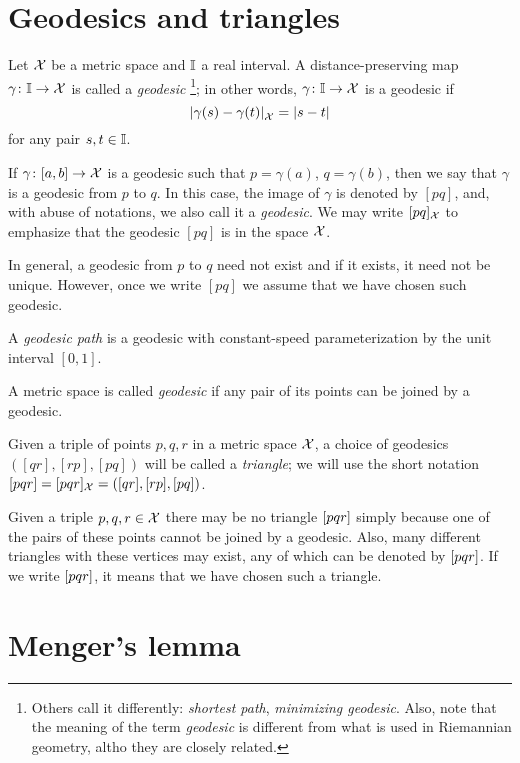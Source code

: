 \section{Geodesics and triangles}

Let $\mathcal{X}$ be a metric space 
and $\II$\index{$\II$} a real interval. 
A distance-preserving map $\gamma\colon\mathbb{I}\to \mathcal{X}$ is called a \emph{geodesic}%
\footnote{Others call it differently: \textit{shortest path}, \textit{minimizing geodesic}.
Also, note that the meaning of the term \textit{geodesic} is different from what is used in Riemannian geometry, altho they are closely related.}; 
in other words, $\gamma\colon\mathbb{I}\to \mathcal{X}$ is a geodesic if 
\[\dist{\gamma(s)}{\gamma(t)}{\spc{X}}=|s-t|\]
for any pair $s,t\in \mathbb{I}$.

If $\gamma\colon[a,b]\to \mathcal{X}$ is a geodesic such that $p=\gamma(a)$, $q=\gamma(b)$, then we say that $\gamma$ is a geodesic from $p$ to $q$.
In this case, the image of $\gamma$ is denoted by $[p q]$\index{$[{*}{*}]$}, and, with abuse of notations, we also call it a \emph{geodesic}.
We may write $[p q]_{\mathcal{X}}$ 
to emphasize that the geodesic $[p q]$ is in the space  ${\mathcal{X}}$.

In general, a geodesic from $p$ to $q$ need not exist and if it exists, it need not  be unique.  
However, once we write $[p q]$ we assume that we have chosen such geodesic.

A \emph{geodesic path} is a geodesic with constant-speed parameterization by the unit interval $[0,1]$.

A metric space is called \emph{geodesic} if any pair of its points can be joined by a geodesic.

Given a triple of points $p,q,r$ in a metric space $\mathcal{X}$, a choice of geodesics $([q r], [r p], [p q])$ will be called a \emph{triangle}; we will use the short notation 
$[pqr]=[pqr]_{\mathcal{X}}=([q r], [r p], [p q])$\index{$\trig {{*}}{{*}}{{*}}$}.

Given a triple $p,q,r\in \mathcal{X}$ there may be no triangle 
$[pqr]$ simply because one of the pairs of these points cannot be joined by a geodesic.
Also, many different triangles with these vertices may exist, any of which can be denoted by $[pqr]$.
If we write $[pqr]$, it means that we have chosen such a triangle.

\section{Menger's lemma}

